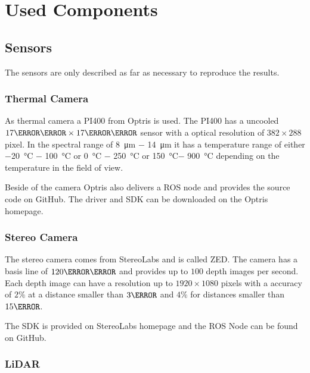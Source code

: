 \chapter{Used Components}\label{ch:usedComponents}
\section{Sensors}\label{sec:sensors}

The sensors are only described as far as necessary to reproduce the results.

\subsection{Thermal Camera}\label{ssec:HWthermalCamera}

As thermal camera a PI400 from Optris is used.
The PI400 has a uncooled $17\micro\meter \times 17\micro\meter$ sensor with a optical resolution of $382 \times 288$ pixel.
In the spectral range of \SI{8}{\micro\meter} $-$ \SI{14}{\micro\meter} it has a temperature range of either \SI{-20}{\celsius} $-$ \SI{100}{\celsius} or \SI{0}{\celsius} $-$ \SI{250}{\celsius} or \SI{150}{\celsius}$-$ \SI{900}{\celsius} depending on the temperature in the field of view\cite{PI400}.

Beside of the camera Optris also delivers a ROS node and provides the source code on GitHub\cite{OptrisROSNode}.
The driver and \ac{SDK} can be downloaded on the Optris homepage.


\subsection{Stereo Camera}\label{ssec:HWstereoCamera}

The stereo camera comes from StereoLabs and is called ZED.
The camera has a basis line of $120\milli\meter$ and provides up to $100$ depth images per second.
Each depth image can have a resolution up to $1920 \times 1080$ pixels with a accuracy of $2\percent$ at a distance smaller than $3\meter$ and $4\percent$ for distances smaller than $15\meter$\cite{ZED}.

The \ac{SDK} is provided on StereoLabs homepage and the ROS Node can be found on GitHub\cite{ZEDROSNode}.

\subsection{LiDAR}\label{ssec:HWLiDAR}

